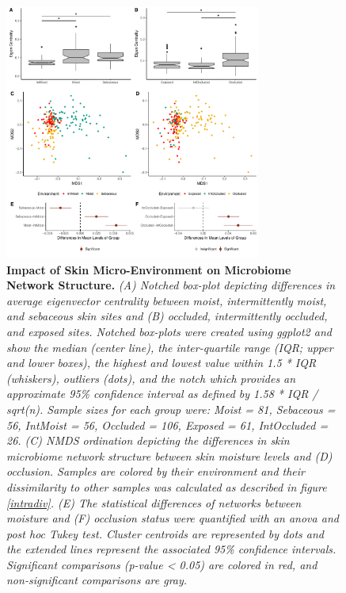 \documentclass[12pt,]{article}
\begin{document}
\begin{figure}[htbp]
\centering
\includegraphics[width=0.75000\textwidth]{../figures/skinplotresults.pdf}
\caption{\textbf{Impact of Skin Micro-Environment on Microbiome Network
Structure.} \emph{(A) Notched box-plot depicting differences in average
eigenvector centrality between moist, intermittently moist, and
sebaceous skin sites and (B) occluded, intermittently occluded, and
exposed sites. Notched box-plots were created using ggplot2 and show the
median (center line), the inter-quartile range (IQR; upper and lower
boxes), the highest and lowest value within 1.5 * IQR (whiskers),
outliers (dots), and the notch which provides an approximate 95\%
confidence interval as defined by 1.58 * IQR / sqrt(n). Sample sizes for
each group were: Moist = 81, Sebaceous = 56, IntMoist = 56, Occluded =
106, Exposed = 61, IntOccluded = 26. (C) NMDS ordination depicting the
differences in skin microbiome network structure between skin moisture
levels and (D) occlusion. Samples are colored by their environment and
their dissimilarity to other samples was calculated as described in
figure \ref{intradiv}. (E) The statistical differences of networks
between moisture and (F) occlusion status were quantified with an anova
and post hoc Tukey test. Cluster centroids are represented by dots and
the extended lines represent the associated 95\% confidence intervals.
Significant comparisons (p-value \textless{} 0.05) are colored in red,
and non-significant comparisons are gray.}\label{skinnetwork}}
\end{figure}

\newpage
\end{document}
